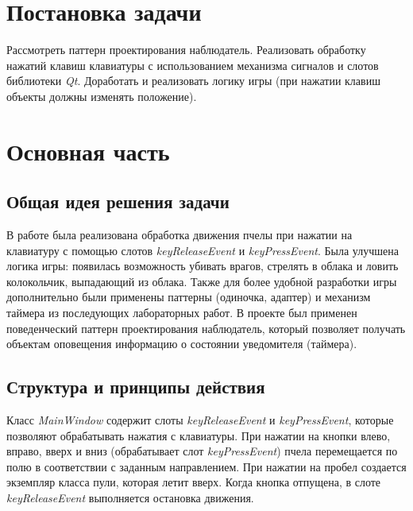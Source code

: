 \documentclass[a4paper,14pt]{article}
\begin{document}

\setcounter{page}{2} %

\renewcommand\contentsname{\centering {\normalsize Содержание}}
\tableofcontents
\newpage

\section*{Постановка задачи}

Рассмотреть паттерн проектирования наблюдатель. Реализовать обработку нажатий клавиш клавиатуры с использованием механизма сигналов и слотов библиотеки \textit{Qt}. Доработать и реализовать логику игры (при нажатии клавиш объекты должны изменять положение).


\newpage

\section{Основная часть}
\subsection{Общая идея решения задачи}
В работе была реализована обработка движения пчелы при нажатии на клавиатуру с помощью слотов \textit{keyReleaseEvent} и \textit{keyPressEvent}. Была улучшена логика игры: появилась возможность убивать врагов, стрелять в облака и ловить колокольчик, выпадающий из облака.
Также для более удобной разработки игры дополнительно были применены паттерны (одиночка, адаптер) и механизм таймера из последующих лабораторных работ.
В проекте был применен поведенческий паттерн проектирования наблюдатель, который позволяет получать объектам оповещения информацию о состоянии уведомителя (таймера).

\subsection{Структура и принципы действия}
Класс \textit{MainWindow} содержит слоты \textit{keyReleaseEvent} и \textit{keyPressEvent}, которые позволяют обрабатывать нажатия с клавиатуры. При нажатии на кнопки влево, вправо, вверх и вниз (обрабатывает слот \textit{keyPressEvent}) пчела перемещается по полю в соответствии с заданным направлением. При нажатии на пробел создается экземпляр класса пули, которая летит вверх. Когда кнопка отпущена, в слоте \textit{keyReleaseEvent} выполняется остановка движения. 
\end{document}
